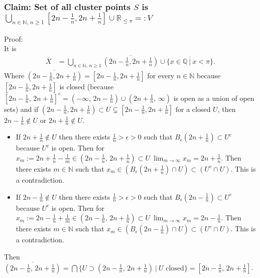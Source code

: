 \documentclass{article}
\begin{document}
\subsubsection*{Claim: Set of all cluster points $S$ is $\bigcup_{n \in \mathbb{N},\, n \geq 1} [2n - \frac{1}{n}, 2n + \frac{1}{n}] \cup \mathbb{R}_{\leq\pi}=:V$}
Proof: \\
It is
\begin{align*}
    \overline{X} & = \bigcup_{n \in \mathbb{N} ,\, n \geq 1} \overline{(2n-\frac{1}{n}, 2n + \frac{1}{n})} \cup \overline{\{x \in \mathbb{Q} \ | \ x < \pi\}}.
\end{align*}
Where $ \overline{(2n-\frac{1}{n}, 2n + \frac{1}{n})} = [2n-\frac{1}{n}, 2n + \frac{1}{n}] $ for every $n \in \mathbb{N}$ because $[2n-\frac{1}{n}, 2n + \frac{1}{n}]$ is closed (because $ [2n - \frac{1}{n} ,\, 2n + \frac{1}{n}]^{c} = (-\infty ,\, 2n - \frac{1}{n}) \cup (2n + \frac{1}{n} ,\, \infty)$ is open as a union of open sets) and if $(2n-\frac{1}{n}, 2n + \frac{1}{n}) \subset U \subsetneq [2n-\frac{1}{n}, 2n + \frac{1}{n}]$ for a closed $U$, then $2n -\frac{1}{n} \notin U$ or $2n +\frac{1}{n} \notin U$.
\begin{itemize}
\item If $2n + \frac{1}{n} \notin U$ then there exists $\frac{1}{n} > \epsilon > 0$ such that $B_{\epsilon}(2n + \frac{1}{n}) \subset U^{c}$ because $U^{c}$ is open.
  Then for $x_{m}:=2n+\frac{1}{n} - \frac{1}{m} \in (2n - \frac{1}{n} ,\, 2n + \frac{1}{n}) \subset U \ \lim_{m \rightarrow \infty} x_{m} = 2n + \frac{1}{n}$.
  Then there exists $m \in \mathbb{N}$ such that $x_{m} \in (B_{\epsilon}(2n + \frac{1}{n}) \cap U) \subset (U^{c} \cap U)$.
  This is a contradiction.
\item If $2n - \frac{1}{n} \notin U$ then there exists $\frac{1}{n} > \epsilon > 0$ such that $B_{\epsilon}(2n - \frac{1}{n}) \subset U^{c}$ because $U^{c}$ is open.
  Then for $x_{m}:=2n-\frac{1}{n} + \frac{1}{m} \in (2n - \frac{1}{n} ,\, 2n + \frac{1}{n}) \subset U \ \lim_{m \rightarrow \infty} x_{m} = 2n - \frac{1}{n}$.
  Then there exists $m \in \mathbb{N}$ such that $x_{m} \in (B_{\epsilon}(2n - \frac{1}{n}) \cap U) \subset (U^{c} \cap U)$.
  This is a contradiction.
\end{itemize}

Then $\overline{(2n - \frac{1}{n} ,\, 2n + \frac{1}{n})} = \bigcap \{ U \supset (2n - \frac{1}{n} ,\, 2n + \frac{1}{n}) \ | \ U \text{ closed}\} = [2n - \frac{1}{n} ,\, 2n + \frac{1}{n}]$.\\
\end{document}

